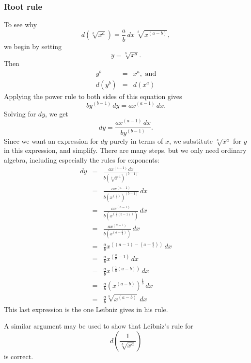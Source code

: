 \documentclass[twoside,openright]{article}
\newlength{\oldjot}
\begin{document}
\subsubsection*{Root rule}

To see why 
$$d(\sqrt[b]{x^a}) = \frac{a}{b}\,dx\,\sqrt[b]{x^{(a-b)}},$$
 we begin by setting
$$y = \sqrt[b]{x^a}.$$
Then
\begin{eqnarray*}
y^b & = & x^a, \mbox{ and}\\
d(y^b) & = & d(x^a)
\end{eqnarray*}
Applying the power rule to both sides of this equation gives
$$by^{(b-1)}\,dy = ax^{(a-1)}\,dx.$$
Solving for $dy$, we get
$$dy = \frac{ax^{(a-1)}\,dx}{by^{(b-1)}}.$$
Since we want an expression for $dy$ purely in terms of $x$, we
substitute $\sqrt[b]{x^a}$ for $y$ in this expression, and simplify.
There are many steps, but we only need ordinary algebra, including
especially the rules for exponents: \setlength{\jot}{2ex}
\begin{eqnarray*}
dy & = & \frac{ax^{(a-1)}\,dx}{b(\sqrt[b]x^a)^{(b-1)}}\\
 & = & \frac{ax^{(a-1)}}{b(x^{(\frac{a}{b})})^{(b-1)}}\,dx\\
 & = & \frac{ax^{(a-1)}}{b(x^{(\frac{a}{b}(b-1))})}\,dx\\
 & = & \frac{ax^{(a-1)}}{b(x^{(a- \frac{a}{b})})}\,dx\\
 & = & \frac{a}{b} x^{((a-1) - (a- \frac{a}{b}))}\,dx\\
 & = & \frac{a}{b} x^{(\frac{a}{b} - 1)}\,dx\\
 & = & \frac{a}{b} x^{(\frac{1}{b}(a- b))}\,dx\\
 & = & \frac{a}{b} (x^{(a-b)})^\frac{1}{b}\,dx\\
 & = & \frac{a}{b} \sqrt[b]{x^{(a-b)}}\,dx
\end{eqnarray*}
\setlength{\jot}{\oldjot}
This last expression is the one Leibniz gives in his rule.

A similar argument may be used to show that Leibniz's rule for 
$$d\left(\frac{1}{\sqrt[b]{x^a}}\right)$$
is correct.
\end{document}
